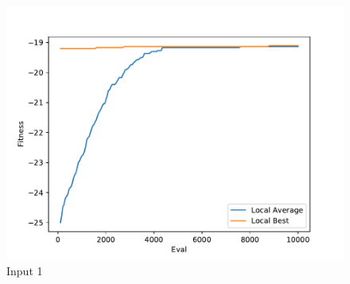 \documentclass{standalone}
\begin{document}
\begin{figure}[!htb]
	\caption{Input 1}
	\label{fig:graph_1049}
	\includegraphics[width=\textwidth]{../graphs/graphs/1049.pdf}
\end{figure}
\end{document}
